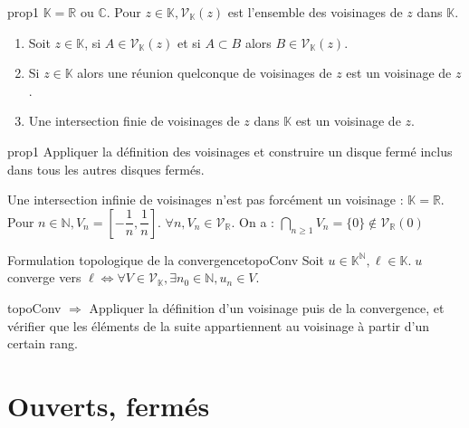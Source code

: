 \documentclass[12pt,a4paper]{report}
\begin{document}
\begin{propositions}{}{prop1}
$\mathbb{K}=\mathbb{R}$ ou $\mathbb{C}$.
\newline Pour $z \in \mathbb{K}, \mathcal{V}_{\mathbb{K}}(z)$ est l'ensemble des voisinages de $z$ dans $\mathbb{K}$.
\begin{enumerate}
\item Soit $z \in \mathbb{K}$, si $A \in \mathcal{V}_{\mathbb{K}}(z)$ et si $A \subset B$ alors $B \in \mathcal{V}_{\mathbb{K}}(z)$.
\item Si $z \in \mathbb{K}$ alors une réunion quelconque de voisinages de $z$ est un voisinage de $z$.
\item Une intersection finie de voisinages de $z$ dans $\mathbb{K}$ est un voisinage de $z$.
\end{enumerate}
\end{propositions}

\begin{principedemo}{prop1}
Appliquer la définition des voisinages et construire un disque fermé inclus dans tous les autres disques fermés.
\end{principedemo}


\begin{remarque}
Une intersection infinie de voisinages n'est pas forcément un voisinage : $\mathbb{K} = \mathbb{R}$. Pour $n \in \mathbb{N}, V_n = \left[-\dfrac{1}{n}, \dfrac{1}{n}\right]$. 
\newline $\forall n, V_n \in \mathcal{V}_\mathbb{R}$.
On a : $\displaystyle{\bigcap_{n \geq 1}} V_n  = \{0\} \not \in \mathcal{V}_{\mathbb{R}}(0)$
\end{remarque}


\begin{proposition}{Formulation topologique de la convergence}{topoConv}
Soit $u \in \mathbb{K}^\mathbb{N}, \ell \in \mathbb{K}. \; u$ converge vers $\ell \Longleftrightarrow \forall V \in \mathcal{V}_{\mathbb{K}}, \exists n_0 \in \mathbb{N}, u_n \in V$.
\end{proposition}

\begin{principedemo}{topoConv}
$\Longrightarrow$ Appliquer la définition d'un voisinage puis de la convergence, et vérifier que les éléments de la suite appartiennent au voisinage à partir d'un certain rang.
\end{principedemo} 

\section{Ouverts, fermés}
\end{document}
